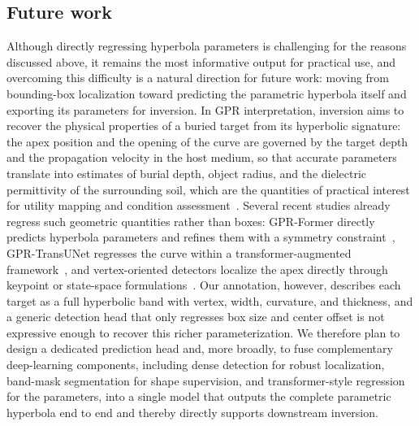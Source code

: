 \documentclass[lettersize,journal]{IEEEtran}
\begin{document}
\subsection{Future work}
Although directly regressing hyperbola parameters is challenging for the reasons
discussed above, it remains the most informative output for practical use, and
overcoming this difficulty is a natural direction for future work: moving from
bounding-box localization toward predicting the parametric hyperbola itself and
exporting its parameters for inversion. In GPR interpretation, inversion aims to
recover the physical
properties of a buried target from its hyperbolic signature: the apex position
and the opening of the curve are governed by the target depth and the
propagation velocity in the host medium, so that accurate parameters translate
into estimates of burial depth, object radius, and the dielectric permittivity of
the surrounding soil, which are the quantities of practical interest for utility
mapping and condition assessment~\cite{liu2022pipeline}. Several recent studies
already regress such geometric quantities rather than boxes: GPR-Former directly
predicts hyperbola parameters and refines them with a symmetry
constraint~\cite{jin2024gprformer}, GPR-TransUNet regresses the curve within a
transformer-augmented framework~\cite{ge2024gprtransunet}, and vertex-oriented
detectors localize the apex directly through keypoint or state-space
formulations~\cite{hou2025endtoend,lan2024statespace}. Our annotation, however,
describes each target as a full hyperbolic band with vertex, width, curvature,
and thickness, and a generic detection head that only regresses box size and
center offset is not expressive enough to recover this richer parameterization.
We therefore plan to design a dedicated prediction head and, more broadly, to
fuse complementary deep-learning components, including dense detection for robust
localization, band-mask segmentation for shape supervision, and transformer-style
regression for the parameters, into a single model that outputs the complete
parametric hyperbola end to end and thereby directly supports downstream
inversion.
\end{document}
